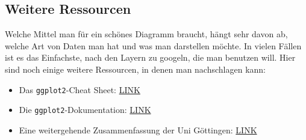 \documentclass[
  letterpaper,
  DIV=11,
  numbers=noendperiod]{scrartcl}
\begin{document}
\hypertarget{weitere-ressourcen}{%
\subsection{Weitere Ressourcen}\label{weitere-ressourcen}}

Welche Mittel man für ein schönes Diagramm braucht, hängt sehr davon ab,
welche Art von Daten man hat und was man darstellen möchte. In vielen
Fällen ist es das Einfachste, nach den Layern zu googeln, die man
benutzen will. Hier sind noch einige weitere Ressourcen, in denen man
nachschlagen kann:

\begin{itemize}
\item
  Das \texttt{ggplot2}-Cheat Sheet:
  \href{https://www.maths.usyd.edu.au/u/UG/SM/STAT3022/r/current/Misc/data-visualization-2.1.pdf}{LINK}
\item
  Die \texttt{ggplot2}-Dokumentation:
  \href{https://ggplot2.tidyverse.org/reference/}{LINK}
\item
  Eine weitergehende Zusammenfassung der Uni Göttingen:
  \href{https://md.psych.bio.uni-goettingen.de/mv/unit/ggplot2/ggplot2.html}{LINK}
\end{itemize}
\end{document}
